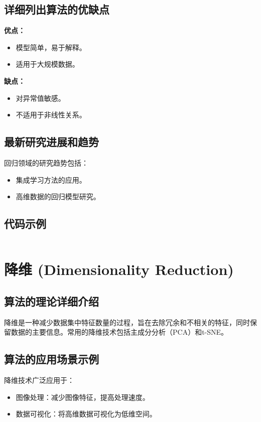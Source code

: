 \subsection*{详细列出算法的优缺点}
\textbf{优点：}
\begin{itemize}
    \item 模型简单，易于解释。
    \item 适用于大规模数据。
\end{itemize}

\textbf{缺点：}
\begin{itemize}
    \item 对异常值敏感。
    \item 不适用于非线性关系。
\end{itemize}

\subsection*{最新研究进展和趋势}
回归领域的研究趋势包括：
\begin{itemize}
    \item 集成学习方法的应用。
    \item 高维数据的回归模型研究。
\end{itemize}
\subsection*{代码示例}
\begin{lstlisting}

\end{lstlisting}


\section{降维 (Dimensionality Reduction)}
\subsection*{算法的理论详细介绍}
降维是一种减少数据集中特征数量的过程，旨在去除冗余和不相关的特征，同时保留数据的主要信息。常用的降维技术包括主成分分析（PCA）和t-SNE。

\subsection*{算法的应用场景示例}
降维技术广泛应用于：
\begin{itemize}
    \item 图像处理：减少图像特征，提高处理速度。
    \item 数据可视化：将高维数据可视化为低维空间。
\end{itemize}

